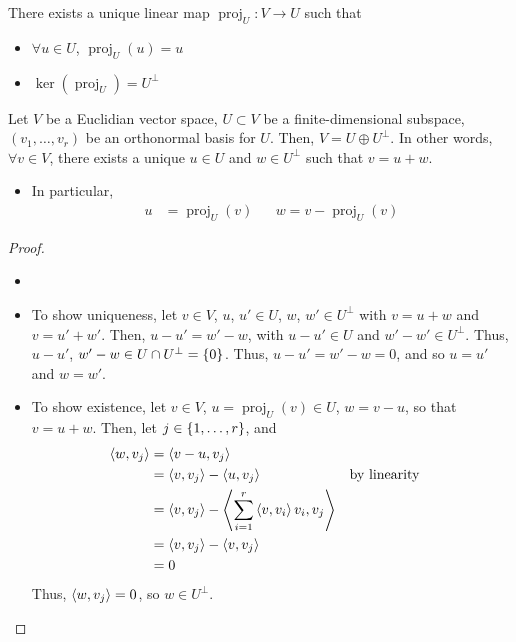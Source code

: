 \documentclass[letterpaper,12pt]{article}
\DeclareMathOperator{\proj}{proj}
\begin{document}
\begin{theorem}
There exists a unique linear map $\proj_{U}: V \rightarrow U$ such that
\begin{itemize}
    \item $\forall u \in U$, $\proj_{U}(u) = u$
    \item $\ker{(\proj_{U})} = U^{\perp}$
\end{itemize}
\end{theorem}

\begin{theorem}
Let $V$ be a Euclidian vector space, $U \subset V$ be a finite-dimensional subspace, $(v_1, \dots, v_r)$ be an orthonormal basis for $U$. Then, $V = U \oplus U^{\perp}$. In other words, $\forall v \in V$, there exists a unique $u \in U$ and $w \in U^{\perp}$ such that $v = u + w$.
\begin{itemize}
    \item In particular,
    \begin{align*}
        u & = \proj_{U}(v) && w = v - \proj_{U}(v)
    \end{align*}
\end{itemize}
\end{theorem}
\begin{proof}
\begin{itemize}
    \item[]
    \item To show uniqueness, let $v \in V$, $u$, $u' \in U$, $w$, $w' \in U^{\perp}$ with $v = u + w$ and $v = u' + w'$. Then, $u - u' = w' - w$, with $u - u' \in U$ and $w' - w' \in U^{\perp}$. Thus, $u - u'$, $w' - w \in U \cap U^{\perp} = \left\{ 0 \right\}$. Thus, $u - u' = w' - w = 0$, and so $u = u'$ and $w = w'$.
    \item To show existence, let $v \in V$, $u = \proj_{U}(v) \in U$, $w = v - u$, so that $v = u + w$. Then, let $j \in \left\{ 1, \dots, r \right\}$, and
    \begin{align*}
        \left< w, v_j \right> & = \left< v - u, v_j \right> \\
        & = \left< v, v_j \right> - \left< u, v_j \right> && \text{by linearity} \\
        & = \left< v, v_j \right> - \left< \sum_{i=1}^r \left< v, v_i \right> v_i, v_j \right> \\
        & = \left< v, v_j \right> - \left< v, v_j \right> \\
        & = 0
    \end{align*}
    Thus, $\left< w, v_j \right> = 0$, so $w \in U^{\perp}$.
\end{itemize}
\end{proof}
\end{document}
